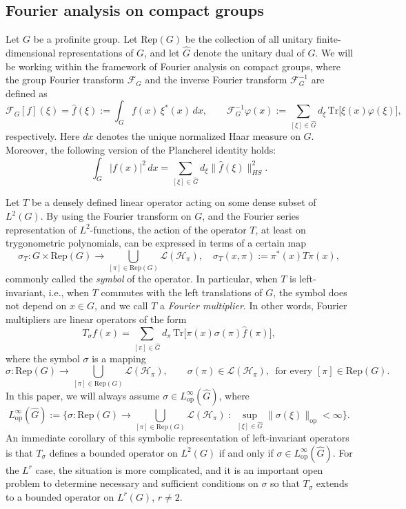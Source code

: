 \documentclass[12pt, reqno]{amsart}
\newcommand{\1}{\mathds{1}}
\begin{document}
\subsection{Fourier analysis on compact groups}
Let $G$ be a profinite group. Let $\mathrm{Rep}(G)$ be the collection of all unitary finite-dimensional representations of $G$, and let $\widehat{G}$ denote the unitary dual of $G$. We will be working within the framework of Fourier analysis on compact groups, where the group Fourier transform $\mathcal{F}_G$ and the inverse Fourier transform $\mathcal{F}_G^{-1}$ are defined as
\[
\mathcal{F}_G[f](\xi) = \widehat{f}(\xi) := \int_G f(x)\, \xi^*(x)\, dx, 
\qquad 
\mathcal{F}_G^{-1} \varphi(x) := \sum_{[\xi] \in \widehat{G}} d_\xi \,\mathrm{Tr} \big[ \xi(x)\varphi(\xi)\big],
\]
respectively. Here $dx$ denotes the unique normalized Haar measure on $G$. Moreover, the following version of the Plancherel identity holds:
\[
\int_G |f(x)|^2\, dx = \sum_{[\xi] \in \widehat{G}} d_\xi \|\widehat{f}(\xi)\|_{HS}^2.
\]

Let $T$ be a densely defined linear operator acting on some dense subset of $L^2(G)$. By using the Fourier transform on $G$, and the Fourier series representation of $L^2$-functions, the action of the operator $T$, at least on trygonometric polynomials, can be expressed in terms of a certain map
\[
\sigma_T : G \times \mathrm{Rep}(G) \to \bigcup_{[\pi] \in \mathrm{Rep}(G)} \mathcal{L}(\mathcal{H}_\pi), 
\quad \sigma_T(x, \pi) := \pi^*(x) T \pi(x),
\]
commonly called the \emph{symbol} of the operator. In particular, when $T$ is left-invariant, i.e., when $T$ commutes with the left translations of $G$, the symbol does not depend on $x \in G$, and we call $T$ a \emph{Fourier multiplier}. In other words, Fourier multipliers are linear operators of the form
\[
T_\sigma f(x) = \sum_{[\pi] \in \widehat{G}} d_\pi \,\mathrm{Tr} \big[ \pi(x) \sigma(\pi) \widehat{f}(\pi)\big],
\]
where the symbol $\sigma$ is a mapping
\[
\sigma : \mathrm{Rep}(G) \to \bigcup_{[\pi] \in \mathrm{Rep}(G)} \mathcal{L}(\mathcal{H}_\pi),
\qquad \sigma(\pi) \in \mathcal{L}(\mathcal{H}_\pi), \,  \text{ for every } [\pi] \in \mathrm{Rep}(G).
\]
In this paper, we will always assume $\sigma \in L^\infty_{\mathrm{op}}(\widehat{G})$, where
\[
L^\infty_{\mathrm{op}}(\widehat{G}) := \Big\{\sigma : \mathrm{Rep}(G) \to \bigcup_{[\pi] \in \mathrm{Rep}(G)} \mathcal{L}(\mathcal{H}_\pi) \ : \ \sup_{[\xi] \in \widehat{G}} \|\sigma(\xi)\|_{\mathrm{op}} < \infty \Big\}.
\]
An immediate corollary of this symbolic representation of left-invariant operators is that $T_\sigma$ defines a bounded operator on $L^2(G)$ if and only if $\sigma \in L^\infty_{\mathrm{op}}(\widehat{G})$. For the $L^r$ case, the situation is more complicated, and it is an important open problem to determine necessary and sufficient conditions on $\sigma$ so that $T_\sigma$ extends to a bounded operator on $L^r(G)$, $r \neq 2$.
\end{document}
